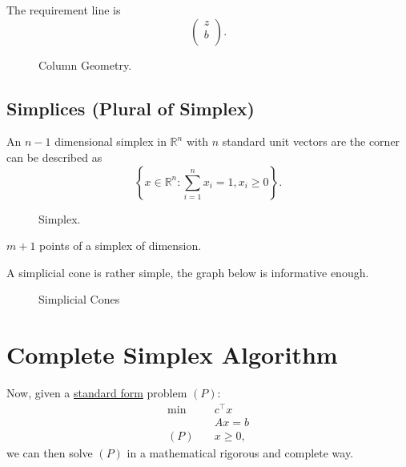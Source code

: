 The requirement line is
\[
	\begin{pmatrix}
		z \\
		b \\
	\end{pmatrix}.
\]

\begin{figure}[H]
	\centering
	\caption{Column Geometry.}
	\label{fig:column-geometry}
\end{figure}

\subsection{Simplices (Plural of Simplex)}
\begin{eg}[Simplex]
	An \(n-1\) dimensional simplex in \(\mathbb{R}^n\) with \(n\) standard unit vectors are the corner can be described as
	\[
		\left\{x\in \mathbb{R}^n \colon \sum\limits_{i=1}^{n} x_i = 1, x_i \geq 0\right\}.
	\]
	\begin{figure}[H]
		\centering
		\caption{Simplex.}
		\label{fig:simplex}
	\end{figure}
\end{eg}

\begin{note}
	\(m+1\) points of a simplex of dimension.
\end{note}

A simplicial cone is rather simple, the graph below is informative enough.
\begin{figure}[H]
	\centering
	\caption{Simplicial Cones}
	\label{fig:simplicial-cones}
\end{figure}

\section{Complete Simplex Algorithm}
Now, given a \hyperref[def:standard-form]{standard form} problem \((P)\):
\[
	\begin{aligned}
		\min~    & c^{\top}x \\
		         & Ax = b    \\
		(P)\quad & x\geq 0,
	\end{aligned}
\]
we can then solve \((P)\) in a mathematical rigorous and complete way.

